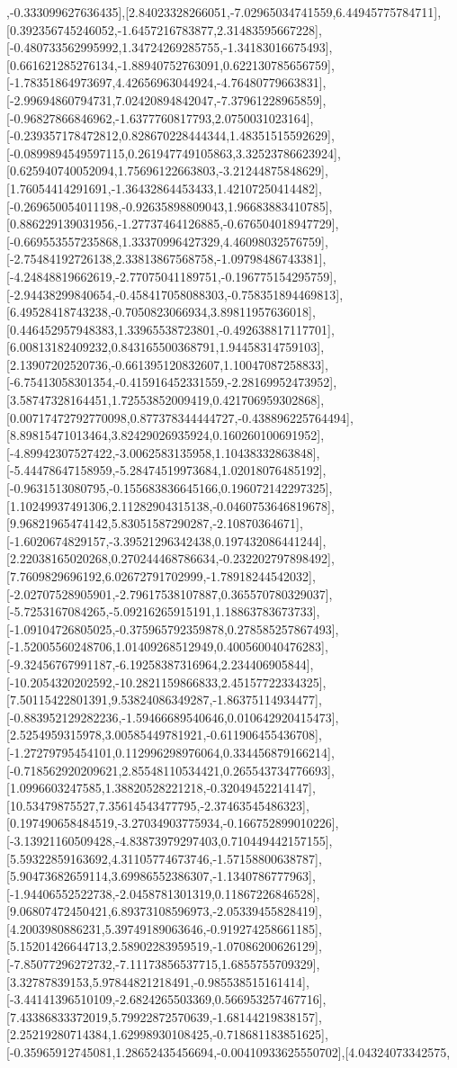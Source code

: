 \documentclass{article}
\begin{document}
,-0.333099627636435],[2.84023328266051,-7.02965034741559,6.44945775784711],[0.392356745246052,-1.6457216783877,2.31483595667228],[-0.480733562995992,1.34724269285755,-1.34183016675493],[0.661621285276134,-1.88940752763091,0.622130785656759],[-1.78351864973697,4.42656963044924,-4.76480779663831],[-2.99694860794731,7.02420894842047,-7.37961228965859],[-0.96827866846962,-1.6377760817793,2.0750031023164],[-0.239357178472812,0.828670228444344,1.48351515592629],[-0.0899894549597115,0.261947749105863,3.32523786623924],[0.625940740052094,1.75696122663803,-3.21244875848629],[1.76054414291691,-1.36432864453433,1.42107250414482],[-0.269650054011198,-0.92635898809043,1.96683883410785],[0.886229139031956,-1.27737464126885,-0.676504018947729],[-0.669553557235868,1.33370996427329,4.46098032576759],[-2.75484192726138,2.33813867568758,-1.09798486743381],[-4.24848819662619,-2.77075041189751,-0.196775154295759],[-2.94438299840654,-0.458417058088303,-0.758351894469813],[6.49528418743238,-0.7050823066934,3.89811957636018],[0.446452957948383,1.33965538723801,-0.492638817117701],[6.00813182409232,0.843165500368791,1.94458314759103],[2.13907202520736,-0.661395120832607,1.10047087258833],[-6.75413058301354,-0.415916452331559,-2.28169952473952],[3.58747328164451,1.72553852009419,0.421706959302868],[0.00717472792770098,0.877378344444727,-0.438896225764494],[8.89815471013464,3.82429026935924,0.160260100691952],[-4.89942307527422,-3.0062583135958,1.10438332863848],[-5.44478647158959,-5.28474519973684,1.02018076485192],[-0.9631513080795,-0.155683836645166,0.196072142297325],[1.10249937491306,2.11282904315138,-0.0460753646819678],[9.96821965474142,5.83051587290287,-2.10870364671],[-1.6020674829157,-3.39521296342438,0.197432086441244],[2.22038165020268,0.270244468786634,-0.232202797898492],[7.7609829696192,6.02672791702999,-1.78918244542032],[-2.02707528905901,-2.79617538107887,0.365570780329037],[-5.7253167084265,-5.09216265915191,1.18863783673733],[-1.09104726805025,-0.375965792359878,0.278585257867493],[-1.52005560248706,1.01409268512949,0.400560040476283],[-9.32456767991187,-6.19258387316964,2.234406905844],[-10.2054320202592,-10.2821159866833,2.45157722334325],[7.50115422801391,9.53824086349287,-1.86375114934477],[-0.883952129282236,-1.59466689540646,0.010642920415473],[2.5254959315978,3.00585449781921,-0.611906455436708],[-1.27279795454101,0.112996298976064,0.334456879166214],[-0.718562920209621,2.85548110534421,0.265543734776693],[1.0996603247585,1.38820528221218,-0.32049452214147],[10.53479875527,7.35614543477795,-2.37463545486323],[0.197490658484519,-3.27034903775934,-0.166752899010226],[-3.13921160509428,-4.83873979297403,0.710449442157155],[5.59322859163692,4.31105774673746,-1.57158800638787],[5.90473682659114,3.69986552386307,-1.1340786777963],[-1.94406552522738,-2.0458781301319,0.11867226846528],[9.06807472450421,6.89373108596973,-2.05339455828419],[4.2003980886231,5.39749189063646,-0.919274258661185],[5.15201426644713,2.58902283959519,-1.07086200626129],[-7.85077296272732,-7.11173856537715,1.6855755709329],[3.32787839153,5.97844821218491,-0.985538515161414],[-3.44141396510109,-2.6824265503369,0.566953257467716],[7.43386833372019,5.79922872570639,-1.68144219838157],[2.25219280714384,1.62998930108425,-0.718681183851625],[-0.35965912745081,1.28652435456694,-0.00410933625550702],[4.04324073342575,
\end{document}
